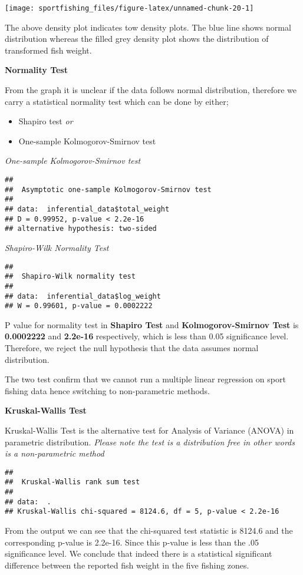 \documentclass[
]{article}
\providecommand{\tightlist}{%
  \setlength{\itemsep}{0pt}\setlength{\parskip}{0pt}}
\begin{document}
\begin{center}\texttt{[image: sportfishing\_files/figure-latex/unnamed-chunk-20-1]} \end{center}

The above density plot indicates tow density plots. The blue line shows
normal distribution whereas the filled grey density plot shows the
distribution of transformed fish weight.

\newpage

\textbf{Normality Test}

From the graph it is unclear if the data follows normal distribution,
therefore we carry a statistical normality test which can be done by
either;

\begin{itemize}
\tightlist
\item
  Shapiro test \emph{or}
\item
  One-sample Kolmogorov-Smirnov test
\end{itemize}

\emph{One-sample Kolmogorov-Smirnov test}

\begin{verbatim}
## 
##  Asymptotic one-sample Kolmogorov-Smirnov test
## 
## data:  inferential_data$total_weight
## D = 0.99952, p-value < 2.2e-16
## alternative hypothesis: two-sided
\end{verbatim}

\emph{Shapiro-Wilk Normality Test}

\begin{verbatim}
## 
##  Shapiro-Wilk normality test
## 
## data:  inferential_data$log_weight
## W = 0.99601, p-value = 0.0002222
\end{verbatim}

P value for normality test in \textbf{Shapiro Test} and
\textbf{Kolmogorov-Smirnov Test} is \textbf{0.0002222} and
\textbf{2.2e-16} respectively, which is less than 0.05 significance
level. Therefore, we reject the null hypothesis that the data assumes
normal distribution.

The two test confirm that we cannot run a multiple linear regression on
sport fishing data hence switching to non-parametric methods.

\textbf{Kruskal-Wallis Test}

Kruskal-Wallis Test is the alternative test for Analysis of Variance
(ANOVA) in parametric distribution. \emph{Please note the test is a
distribution free in other words is a non-parametric method}

\begin{verbatim}
## 
##  Kruskal-Wallis rank sum test
## 
## data:  .
## Kruskal-Wallis chi-squared = 8124.6, df = 5, p-value < 2.2e-16
\end{verbatim}

From the output we can see that the chi-squared test statistic is 8124.6
and the corresponding p-value is 2.2e-16. Since this p-value is less
than the .05 significance level. We conclude that indeed there is a
statistical significant difference between the reported fish weight in
the five fishing zones.
\end{document}
